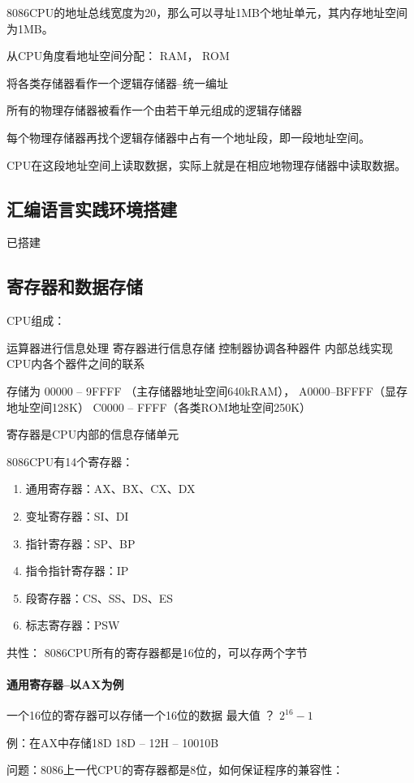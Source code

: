 \documentclass[12pt]{ctexart}
\begin{document}
8086CPU的地址总线宽度为20，那么可以寻址1MB个地址单元，其内存地址空间为1MB。

从CPU角度看地址空间分配：
RAM， ROM

将各类存储器看作一个逻辑存储器--统一编址

所有的物理存储器被看作一个由若干单元组成的逻辑存储器

每个物理存储器再找个逻辑存储器中占有一个地址段，即一段地址空间。

CPU在这段地址空间上读取数据，实际上就是在相应地物理存储器中读取数据。

\subsection{汇编语言实践环境搭建}
已搭建

\subsection{寄存器和数据存储}
CPU组成：

运算器进行信息处理
寄存器进行信息存储
控制器协调各种器件
内部总线实现CPU内各个器件之间的联系

存储为 00000 -- 9FFFF （主存储器地址空间640kRAM），
A0000--BFFFF（显存地址空间128K） C0000 -- FFFF（各类ROM地址空间250K）

寄存器是CPU内部的信息存储单元

8086CPU有14个寄存器：

\begin{enumerate}
    \item 通用寄存器：AX、BX、CX、DX
    \item 变址寄存器：SI、DI
    \item 指针寄存器：SP、BP
    \item 指令指针寄存器：IP
    \item 段寄存器：CS、SS、DS、ES
    \item 标志寄存器：PSW
\end{enumerate}
共性：
8086CPU所有的寄存器都是16位的，可以存两个字节

\paragraph{通用寄存器--以AX为例}

一个16位的寄存器可以存储一个16位的数据
最大值 ？ $2^{16} - 1 $

例：在AX中存储18D
18D -- 12H -- 10010B

问题：8086上一代CPU的寄存器都是8位，如何保证程序的兼容性：
\end{document}
